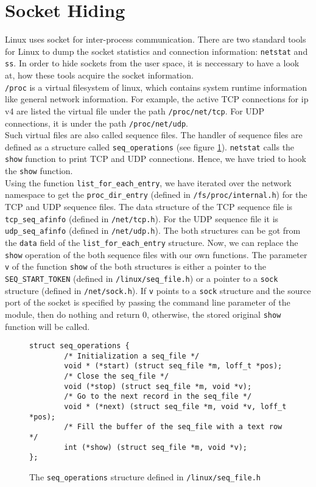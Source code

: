 \section{Socket Hiding}
Linux uses socket for inter-process communication. There are two standard tools for Linux to dump the socket statistics and connection information: \texttt{netstat} and \texttt{ss}. In order to hide sockets from the user space, it is neccessary to have a look at, how these tools acquire the socket information. \\
\verb+/proc+ is a virtual filesystem of linux, which contains system runtime information like general network information. For example, the active TCP connections for ip v4 are listed the virtual file under the path \verb+/proc/net/tcp+. For UDP connections, it is under the path \verb+/proc/net/udp+.\\
Such virtual files are also called sequence files. The handler of sequence files 
are defined as a structure called \verb+seq_operations+ (see figure 
\ref{ls:op}). \verb+netstat+ calls the \verb+show+ function to print TCP and UDP 
connections. Hence, we have tried to hook the \verb+show+ function.\\
Using the function \verb+list_for_each_entry+, we have iterated over the network 
namespace to get the \verb+proc_dir_entry+ (defined in 
\verb+/fs/proc/internal.h+) for the TCP and UDP sequence files. The data 
structure of the TCP sequence file is \verb+tcp_seq_afinfo+ (defined in 
\verb+/net/tcp.h+). For the UDP sequence file it is \verb+udp_seq_afinfo+ 
(defined in \verb+/net/udp.h+). The both structures can be got from the 
\verb+data+ field of the \verb+list_for_each_entry+ structure. Now, we can 
replace the \verb+show+ operation of the both sequence files with our own 
functions. The parameter \verb+v+ of the function \verb+show+ of the both 
structures is either a pointer to the \verb+SEQ_START_TOKEN+ (defined in 
\verb+/linux/seq_file.h+) or a pointer to a \verb+sock+ structure (defined in 
\verb+/net/sock.h+). If \verb+v+ points to a \verb+sock+ structure and the 
source port of the socket is specified by passing the command line parameter of 
the module, then do nothing and return 0, otherwise, the stored original 
\verb+show+ function will be called.
\begin{center}
\begin{figure}
\lstset{escapechar=,style=customc}
\begin{lstlisting}
struct seq_operations {
		/* Initialization a seq_file */		
		void * (*start) (struct seq_file *m, loff_t *pos);
		/* Close the seq_file */
		void (*stop) (struct seq_file *m, void *v);
		/* Go to the next record in the seq_file */
		void * (*next) (struct seq_file *m, void *v, loff_t *pos);
		/* Fill the buffer of the seq_file with a text row */
		int (*show) (struct seq_file *m, void *v);
};
\end{lstlisting}
\caption{The \texttt{seq\_operations} structure defined in 
\texttt{/linux/seq\_file.h}}
\label{ls:op}
\end{figure}
\end{center}
